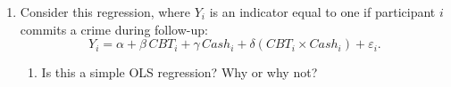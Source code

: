 \documentclass[12pt]{article}
\begin{document}
\begin{enumerate}
%
%
%
%
%
%

\vspace{4cm}


\item Consider this regression, where $Y_i$ is an indicator equal to one if participant $i$ commits a crime during follow-up:
\[
Y_i=\alpha+\beta\,CBT_i+\gamma\,Cash_i+\delta(CBT_i\times Cash_i)+\varepsilon_i.
\]
\begin{enumerate}
\item Is this a simple OLS regression? Why or why not?
\vspace{2cm}


\end{enumerate}
\end{enumerate}
\end{document}
